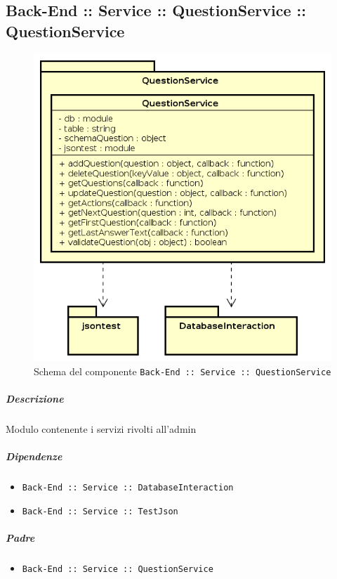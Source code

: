 \documentclass[../ManualeSviluppatore_v2.0.0.tex]{subfiles}
\begin{document}
\subsection{Back-End :: Service :: QuestionService :: QuestionService}
\begin{figure}[!h]
	\centering
	\includegraphics[scale=0.6]{Architettura/Back-End/Service/QuestionService.png}
	\caption{Schema del componente \texttt{Back-End :: Service :: QuestionService}}
\end{figure}
\subparagraph{Descrizione} Modulo contenente i servizi rivolti all'admin
\subparagraph{Dipendenze}
\begin{itemize}
	\item \texttt{Back-End :: Service :: DatabaseInteraction}
	\item \texttt{Back-End :: Service :: TestJson}
\end{itemize}
\subparagraph{Padre}
\begin{itemize}
	\item \texttt{Back-End :: Service :: QuestionService}
\end{itemize}
\end{document}
